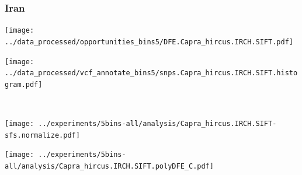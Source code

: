 \subsubsection{Iran}

\begin{minipage}{0.49\linewidth}
    \texttt{[image: ../data\_processed/opportunities\_bins5/DFE.Capra\_hircus.IRCH.SIFT.pdf]}
\end{minipage}
\begin{minipage}{0.49\linewidth}
    \texttt{[image: ../data\_processed/vcf\_annotate\_bins5/snps.Capra\_hircus.IRCH.SIFT.histogram.pdf]}
\end{minipage}
\\
\begin{minipage}{0.49\linewidth}
    \texttt{[image: ../experiments/5bins-all/analysis/Capra\_hircus.IRCH.SIFT-sfs.normalize.pdf]}
\end{minipage}
\begin{minipage}{0.4\linewidth}
    \texttt{[image: ../experiments/5bins-all/analysis/Capra\_hircus.IRCH.SIFT.polyDFE\_C.pdf]}
\end{minipage}
